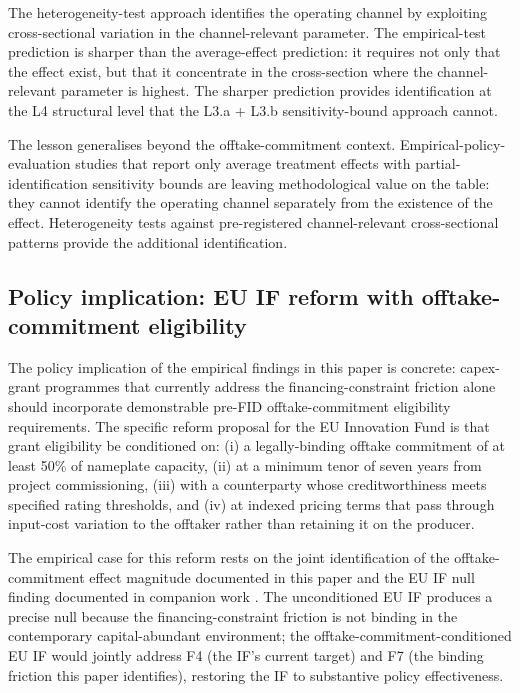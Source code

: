 \documentclass[12pt,a4paper]{article}
\theoremstyle{plain}
\theoremstyle{definition}
\begin{document}
The heterogeneity-test approach identifies the operating channel by exploiting cross-sectional variation in the channel-relevant parameter. The empirical-test prediction is sharper than the average-effect prediction: it requires not only that the effect exist, but that it concentrate in the cross-section where the channel-relevant parameter is highest. The sharper prediction provides identification at the L4 structural level that the L3.a + L3.b sensitivity-bound approach cannot.

The lesson generalises beyond the offtake-commitment context. Empirical-policy-evaluation studies that report only average treatment effects with partial-identification sensitivity bounds are leaving methodological value on the table: they cannot identify the operating channel separately from the existence of the effect. Heterogeneity tests against pre-registered channel-relevant cross-sectional patterns provide the additional identification.

\subsection{Policy implication: EU IF reform with offtake-commitment eligibility}
\label{sec:discussion-policy}

The policy implication of the empirical findings in this paper is concrete: capex-grant programmes that currently address the financing-constraint friction alone should incorporate demonstrable pre-FID offtake-commitment eligibility requirements. The specific reform proposal for the EU Innovation Fund is that grant eligibility be conditioned on: (i) a legally-binding offtake commitment of at least 50\% of nameplate capacity, (ii) at a minimum tenor of seven years from project commissioning, (iii) with a counterparty whose creditworthiness meets specified rating thresholds, and (iv) at indexed pricing terms that pass through input-cost variation to the offtaker rather than retaining it on the producer.

The empirical case for this reform rests on the joint identification of the offtake-commitment effect magnitude documented in this paper and the EU IF null finding documented in companion work \cite{saakstra2026paper2}. The unconditioned EU IF produces a precise null because the financing-constraint friction is not binding in the contemporary capital-abundant environment; the offtake-commitment-conditioned EU IF would jointly address F4 (the IF's current target) and F7 (the binding friction this paper identifies), restoring the IF to substantive policy effectiveness.
\end{document}
